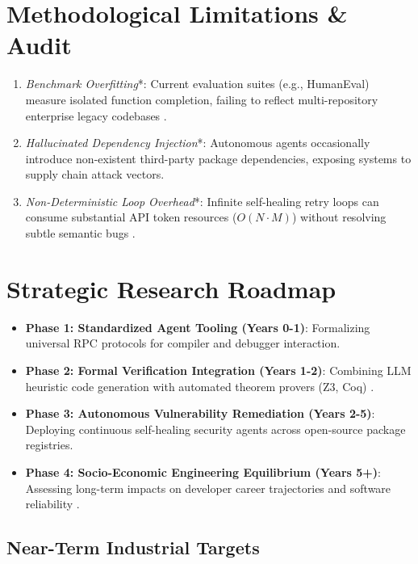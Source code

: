 \documentclass[10pt,journal,compsoc,twocolumn]{IEEEtran}
\begin{document}
\section{Methodological Limitations \& Audit}


\begin{enumerate}
  \item \textit{Benchmark Overfitting}*: Current evaluation suites (e.g., HumanEval) measure isolated function completion, failing to reflect multi-repository enterprise legacy codebases \cite{rogers2003}.
  \item \textit{Hallucinated Dependency Injection}*: Autonomous agents occasionally introduce non-existent third-party package dependencies, exposing systems to supply chain attack vectors.
  \item \textit{Non-Deterministic Loop Overhead}*: Infinite self-healing retry loops can consume substantial API token resources (\mbox{$O(N \cdot M)$}) without resolving subtle semantic bugs \cite{wooldridge2009}.
\end{enumerate}




\section{Strategic Research Roadmap}


\begin{itemize}
  \item \textbf{Phase 1: Standardized Agent Tooling (Years 0-1)}: Formalizing universal RPC protocols for compiler and debugger interaction.
  \item \textbf{Phase 2: Formal Verification Integration (Years 1-2)}: Combining LLM heuristic code generation with automated theorem provers (Z3, Coq) \cite{bratman1987}.
  \item \textbf{Phase 3: Autonomous Vulnerability Remediation (Years 2-5)}: Deploying continuous self-healing security agents across open-source package registries.
  \item \textbf{Phase 4: Socio-Economic Engineering Equilibrium (Years 5+)}: Assessing long-term impacts on developer career trajectories and software reliability \cite{joshua2026adoptiondepth}.
\end{itemize}


\subsection{Near-Term Industrial Targets}
\end{document}
